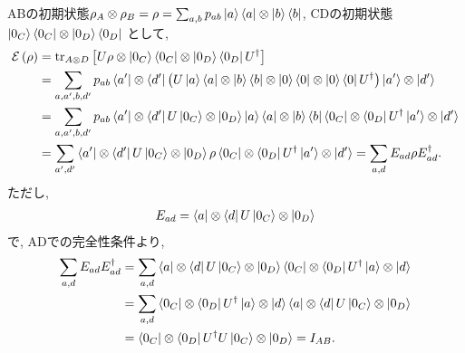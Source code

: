 \begin{ex}
    \label{ex8.3}
    ABの初期状態$\rho_A \otimes \rho_B = \rho =
        \sum_{a,b} p_{ab} \ket{a}\bra{a} \otimes \ket{b}\bra{b}$,
    CDの初期状態$\ket{0_C}\bra{0_C} \otimes \ket{0_D}\bra{0_D}$
    として,
    \begin{align*}
        \mathcal{E}\left(\rho\right)
         & =
        \mathrm{tr}_{A \otimes D}
        \left[
            U \rho \otimes \ket{0_C}\bra{0_C} \otimes \ket{0_D}\bra{0_D} U^\dagger
            \right]
        \\
         & =
        \sum_{a,a', b, d'}
        p_{ab}
        \bra{a'} \otimes \bra{d'}
        \left(
        U \ket{a} \bra{a} \otimes \ket{b}\bra{b} \otimes \ket{0}\bra{0} \otimes \ket{0}\bra{0} U^\dagger
        \right)
        \ket{a'} \otimes \ket{d'}
        \\
         & =
        \sum_{a,a', b, d'}
        p_{ab}
        \bra{a'} \otimes \bra{d'}
        U
        \ket{0_C} \otimes \ket{0_D}
        \ket{a}\bra{a} \otimes \ket{b}\bra{b}
        \bra{0_C} \otimes \bra{0_D}
        U^\dagger
        \ket{a'} \otimes \ket{d'}
        \\
         & =
        \sum_{a',d'}
        \bra{a'} \otimes \bra{d'}
        U
        \ket{0_C} \otimes \ket{0_D}
        \rho
        \bra{0_C} \otimes \bra{0_D}
        U^\dagger
        \ket{a'} \otimes \ket{d'} =
        \sum_{a,d}
        E_{ad}
        \rho
        E_{ad}^\dagger.
    \end{align*}
    ただし,
    \begin{align*}
        E_{ad} = \bra{a} \otimes \bra{d}
        U
        \ket{0_C} \otimes \ket{0_D}
    \end{align*}
    で, ADでの完全性条件より,
    \begin{align*}
        \sum_{a,d}
        E_{ad}
        E_{ad}^\dagger
         & =
        \sum_{a,d}
        \bra{a} \otimes \bra{d}
        U
        \ket{0_C} \otimes \ket{0_D}
        \bra{0_C} \otimes \bra{0_D}
        U^\dagger
        \ket{a} \otimes \ket{d}
        \\
         & =
        \sum_{a,d}
        \bra{0_C} \otimes \bra{0_D}
        U^\dagger
        \ket{a} \otimes \ket{d}
        \bra{a} \otimes \bra{d}
        U
        \ket{0_C} \otimes \ket{0_D}
        \\
         & =
        \bra{0_C} \otimes \bra{0_D}
        U^\dagger
        U
        \ket{0_C} \otimes \ket{0_D} = I_{AB}.
    \end{align*}
\end{ex}

